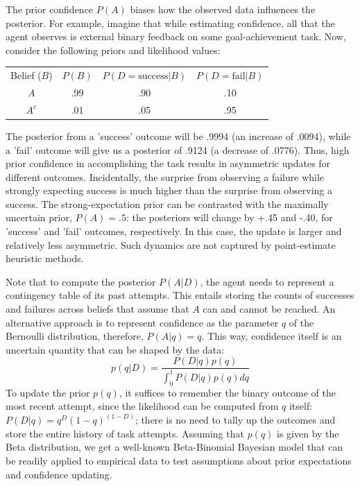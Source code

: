 The prior confidence $P(A)$ biases how the observed data influences the posterior. For example, imagine that while estimating confidence, all that the agent observes is external binary feedback on some goal-achievement task. Now, consider the following priors and likelihood values:
\begin{center}
\begin{tabular}{c c c c}
Belief ($B$) & $P(B)$ & $P(D=\mathrm{success}|B)$ & $P(D=\mathrm{fail}|B)$ \\ 
$A$    & .99    & .90                       & .10        \\  
$A^c$  & .01    & .05                       & .95         
\end{tabular}
\end{center}
The posterior from a 'success' outcome will be .9994 (an increase of .0094), while a 'fail' outcome will give us a posterior of .9124 (a decrease of .0776). Thus, high prior confidence in accomplishing the task results in asymmetric updates for different outcomes. Incidentally, the surprise from observing a failure while strongly expecting success is much higher than the surprise from observing a success. The strong-expectation prior can be contrasted with the maximally uncertain prior, $P(A) = .5$: the posteriors will change by +.45 and -.40, for 'success' and 'fail' outcomes, respectively. In this case, the update is larger and relatively less asymmetric. Such dynamics are not captured by point-estimate heuristic methods.

Note that to compute the posterior $P(A|D)$, the agent needs to represent a contingency table of its past attempts. This entails storing the counts of successes and failures across beliefs that assume that $A$ can and cannot be reached. An alternative approach is to represent confidence as the parameter $q$ of the Bernoulli distribution, therefore, $P(A|q) = q$. This way, confidence itself is an uncertain quantity that can be shaped by the data:
\begin{equation}
    p(q|D) = \frac{P(D|q) p(q)}{\int_{0}^{1}P(D|q)p(q)dq}
\end{equation}
To update the prior $p(q)$, it suffices to remember the binary outcome of the most recent attempt, since the likelihood can be computed from $q$ itself: $P(D|q) = q^D(1-q)^{(1-D)}$; there is no need to tally up the outcomes and store the entire history of task attempts. Assuming that $p(q)$ is given by the Beta distribution, we get a well-known Beta-Binomial Bayesian model that can be readily applied to empirical data to test assumptions about prior expectations and confidence updating.

